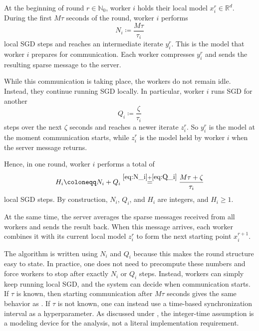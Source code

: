 \documentclass{article}
\newcommand{\bbN}{\mathbb{N}}
\newcommand{\R}{\mathbb{R}}  %
\newcommand{\eqdef}{\coloneqq}
\theoremstyle{plain}
\theoremstyle{definition}
\begin{document}
At the beginning of round $r \in \bbN_0$, worker $i$ holds their local model $x_i^r \in \R^d$.
During the first \(M\tau\) seconds of the round, worker $i$ performs 
\begin{equation}\label{eq:N_i}%
    N_i \eqdef \frac{M\tau}{\tau_i}
\end{equation}
local SGD steps and reaches an intermediate iterate $y_i^r$.
This is the model that worker $i$ prepares for communication.
Each worker compresses \(y_i^r\) and sends the resulting sparse message to the server.

While this communication is taking place, the workers do not remain idle.
Instead, they continue running SGD locally.
In particular, worker $i$ runs SGD for another 
\begin{equation}\label{eq:Q_i}%
    Q_i \eqdef \frac{\zeta}{\tau_i}
\end{equation}
steps over the next \(\zeta\) seconds and reaches a newer iterate \(z_i^r\).
So \(y_i^r\) is the model at the moment communication starts, while \(z_i^r\) is the model held by worker \(i\) when the server message returns.

Hence, in one round, worker \(i\) performs a total of
\begin{equation}\label{eq:H_i}%
    H_i \eqdef N_i+Q_i \overset{\eqref{eq:N_i}+\eqref{eq:Q_i}}{=} \frac{M\tau+\zeta}{\tau_i}
\end{equation}
local SGD steps. 
By construction, \(N_i\), \(Q_i\), and \(H_i\) are integers, and \(H_i \geq 1\).

At the same time, the server averages the sparse messages received from all workers and sends the result back.
When this message arrives, each worker combines it with its current local model \(z_i^r\) to form the next starting point \(x_i^{r+1}\).

The algorithm is written using \(N_i\) and \(Q_i\) because this makes the round structure easy to state.
In practice, one does not need to precompute these numbers and force workers to stop after exactly \(N_i\) or \(Q_i\) steps.
Instead, workers can simply keep running local SGD, and the system can decide when communication starts.
If \(\tau\) is known, then starting communication after \(M\tau\) seconds gives the same behavior as .
If \(\tau\) is not known, one can instead use a time-based synchronization interval as a hyperparameter.
As discussed under , the integer-time assumption is a modeling device for the analysis, not a literal implementation requirement.
\end{document}
